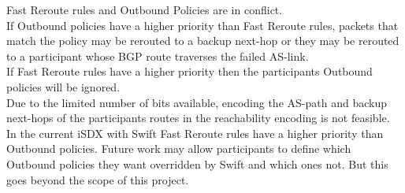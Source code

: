 Fast Reroute rules and Outbound Policies are in conflict.\\
If Outbound policies have a higher priority than Fast Reroute rules, packets that match the policy may be rerouted to a backup next-hop or they may be rerouted to a participant whose BGP route traverses the failed AS-link. \\
If Fast Reroute rules have a higher priority then the participants Outbound policies will be ignored.  \\
Due to the limited number of bits available, encoding the AS-path and backup next-hops of the participants routes in the reachability encoding is not feasible. In the current iSDX with Swift Fast Reroute rules have a higher priority than Outbound policies. Future work may allow participants to define which Outbound policies they want overridden by Swift and which ones not. But this goes beyond the scope of this project.

